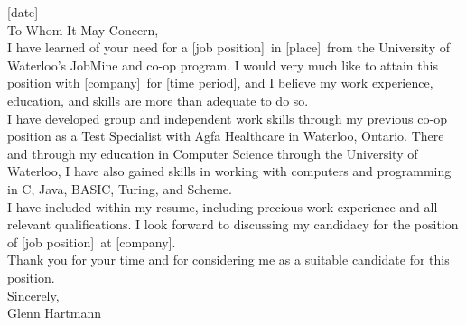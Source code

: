 \documentclass[11pt]{article}
\newcommand{\tdate}{[date]}
\newcommand{\position}{[job position]}
\newcommand{\location}{[place]}
\newcommand{\length}{[time period]}
\newcommand{\company}{[company]}
\begin{document}
    \tdate \\

    To Whom It May Concern, \\

    I have learned of your need for a \position \ in \location \ from the University of Waterloo's JobMine and co-op program. I would very much like to attain this position with \company \ for \length, and I believe my work experience, education, and skills are more than adequate to do so. \\

    I have developed group and independent work skills through my previous co-op position as a Test Specialist with Agfa Healthcare in Waterloo, Ontario. There and through my education in Computer Science through the University of Waterloo, I have also gained skills in working with computers and programming in C, Java, BASIC, Turing, and Scheme. \\

    I have included within my resume, including precious work experience and all relevant qualifications. I look forward to discussing my candidacy for the position of \position \ at \company. \\

    Thank you for your time and for considering me as a suitable candidate for this position. \\

    Sincerely, \\
    Glenn Hartmann
\end{document}
